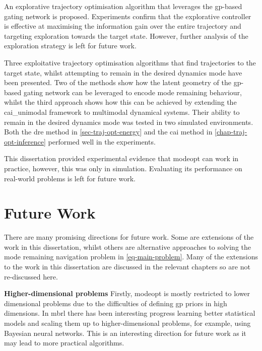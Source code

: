 \documentclass{mimosis-class/mimosis}
\numberwithin{equation}{chapter}
\begin{document}
{An explorative trajectory optimisation algorithm that leverages the \acrshort{gp}-based gating network is proposed.
Experiments confirm that the explorative controller is effective at maximising the
information gain over the entire trajectory and targeting exploration towards the target state.
However, further analysis of the exploration strategy is left for future work.

Three exploitative trajectory optimisation algorithms that find trajectories
to the target state, whilst attempting to remain in the desired dynamics mode have been presented.
Two of the methods show how the latent geometry of the \acrshort{gp}-based gating network
can be leveraged to encode mode remaining behaviour,
whilst the third approach shows how this can be achieved by extending the \acrshort{cai_unimodal} framework
to multimodal dynamical systems.
Their ability to remain in the desired dynamics mode was tested in two simulated environments.
Both the \acrfull{dre} method in \cref{sec-traj-opt-energy}
and the \acrfull{cai} method in \cref{chap-traj-opt-inference}  performed well in the experiments.

This dissertation provided experimental evidence that \acrshort{modeopt} can work in practice,
however, this was only in simulation.
Evaluating its performance on real-world problems is left for future work.

\section{Future Work}
\label{sec:org9b407dc}
There are many promising directions for future work.
Some are extensions of the work in this dissertation, whilst others are alternative approaches to solving the mode
remaining navigation problem in \cref{eq-main-problem}.
Many of the extensions to the work in this dissertation are discussed in the relevant chapters so are not
re-discussed here.

\textbf{Higher-dimensional problems}
Firstly,
\acrshort{modeopt} is mostly restricted to lower dimensional problems due to the difficulties of defining \acrshort{gp} priors
in high dimensions.
In \acrshort{mbrl} there has been interesting progress learning better statistical models and scaling them
up to higher-dimensional problems, for example, using Bayesian neural networks.
This is an interesting direction for future work as it may lead to more practical algorithms.

}
\end{document}
